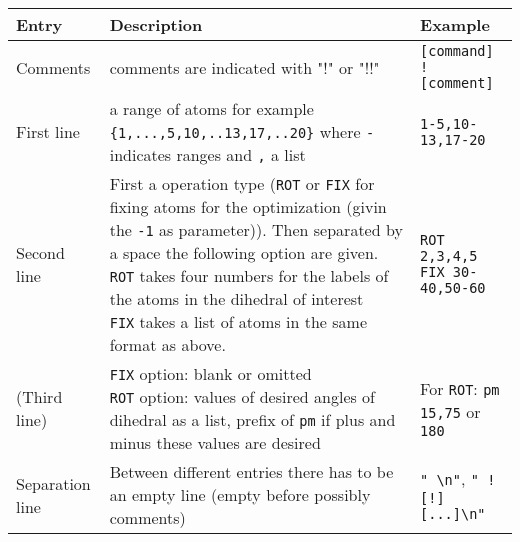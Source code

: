 \documentclass[parskip]{scrartcl}
\begin{document}
        \def\lenone{0.5\textwidth}%
        \def\lentwo{0.3\textwidth}%
        \begin{tabular}{lll}
            Entry & Description & Example
            \\\hline Comments
                &\parbox[t]{\lenone}{
                comments are indicated with "!" or "!!"
                \vspace{.5\baselineskip}
                }
                & \texttt{[command] ! [comment]}
            \\\hline First line
                &\parbox[t]{\lenone}{
                a range of atoms for example \texttt{\{1,...,5,10,..13,17,..20\}} where 
                \texttt{-} indicates ranges and \texttt{,} a list
                \vspace{.5\baselineskip}
                }
                & \texttt{1-5,10-13,17-20}
            \\\hline Second line
                &\parbox[t]{\lenone}{
                First a operation type (\texttt{ROT} or \texttt{FIX} for fixing atoms for the optimization (givin
                the \texttt{-1} as parameter)). Then separated by a
                space the following option are given.\\
                \texttt{ROT} takes four numbers for the labels of the atoms in the dihedral of interest\\
                \texttt{FIX} takes a list of atoms in the same format as above.
                \vspace{.5\baselineskip}
                }
                &
                \parbox[t]{\lentwo}{\texttt{ROT 2,3,4,5} \\ \texttt{FIX 30-40,50-60}
                }
            \\\hline(Third line)
                &\parbox[t]{\lenone}{
                \texttt{FIX} option: blank or omitted\\
                \texttt{ROT} option: values of desired angles of dihedral as a list, prefix of \texttt{pm} if plus
                and minus these values are desired
                \vspace{.5\baselineskip}
                }
                &\parbox[t]{\lentwo}{
                For \texttt{ROT}:  \texttt{pm 15,75} or \texttt{180}
                }
            \\\hline Separation line
                &\parbox[t]{\lenone}{
                Between different entries there has to be an empty line (empty before possibly
                comments)}
                &\parbox[t]{\lentwo}{
                \texttt{"  \textbackslash n"}, \texttt{" ![!] [...]\textbackslash n"}
                }
        \end{tabular}
\end{document}

